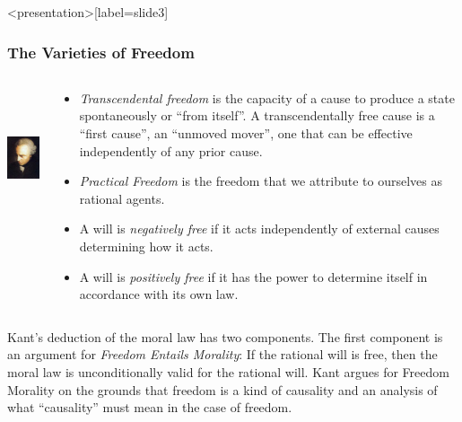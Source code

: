 \change

\begin{frame}<presentation>[label=slide3]
    \frametitle{The Varieties of Freedom}
        \begin{columns}
            \begin{column}{3cm}
                \includegraphics[height=4cm]{../../graphics/kant.jpg}
            \end{column}
            \begin{column}{7cm}
                \begin{itemize}
                    \item \emph{Transcendental freedom} is the capacity of a cause to produce a state spontaneously or ``from itself''. A transcendentally free cause is a ``first cause'', an ``unmoved mover'', one that can be effective independently of any prior cause.
                    \item \emph{Practical Freedom} is the freedom that we attribute to ourselves as rational agents.
                    \item A will is \emph{negatively free} if it acts independently of external causes determining how it acts.
                    \item A will is \emph{positively free} if it has the power to determine itself in accordance with its own law.
                \end{itemize}
            \end{column}
        \end{columns}
\end{frame}

Kant’s deduction of the moral law has two components. The first component is an argument for \emph{Freedom Entails Morality}: If the rational will is free, then the moral law is unconditionally valid for the rational will. Kant argues for Freedom  Morality on the grounds that freedom is a kind of causality and an analysis of what ``causality'' must mean in the case of freedom.

